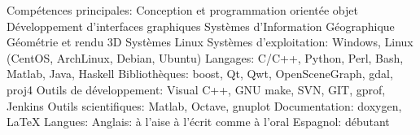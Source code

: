 \begin{cvskills}
  \cvskill
    {Compétences principales:}
 	{
		Conception et programmation orientée objet \newline
 	 	Développement d'interfaces graphiques \newline
 	 	Systèmes d'Information Géographique \newline
	 	Géométrie et rendu 3D \newline
	 	Systèmes Linux
	}
  \cvskill
    {Systèmes d'exploitation:}
 	{Windows, Linux (CentOS, ArchLinux, Debian, Ubuntu)}
  \cvskill
    {Langages:}
 	{C/C++, Python, Perl, Bash, Matlab, Java, Haskell}
  \cvskill
    {Bibliothèques:}
 	{boost, Qt, Qwt, OpenSceneGraph, gdal, proj4}
  \cvskill
	{Outils de développement:}
	{Visual C++, GNU make, SVN, GIT, gprof, Jenkins}
  \cvskill
	{Outils scientifiques:}
	{Matlab, Octave, gnuplot}
  \cvskill
	{Documentation:}
	{doxygen, \LaTeX}
  \cvskill
    {Langues:}
 	{
		Anglais: à l'aise à l'écrit comme à l'oral \newline
		Espagnol: débutant
	}
\end{cvskills}

